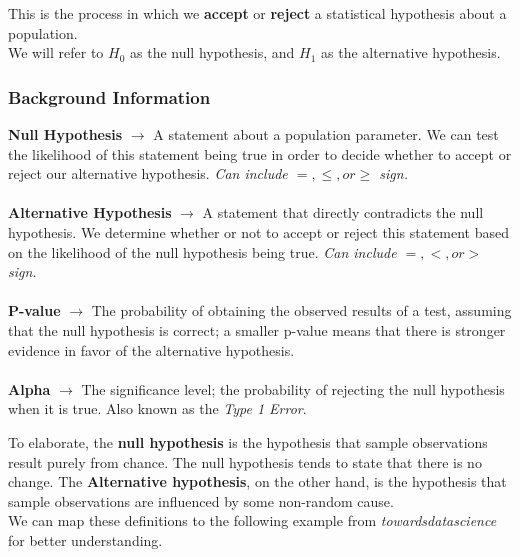 \documentclass[english, 10pt]{article}
\begin{document}
This is the process in which we \textbf{accept} or \textbf{reject} a statistical hypothesis about a population.\\

We will refer to $H_0$ as the null hypothesis, and $H_1$ as the alternative hypothesis.\\

\subsubsection{Background Information}

\begin{tcolorbox}[title=Definition:,colframe=red!75!black,colback=red!5!white,arc=0pt,fonttitle=\bfseries]
\textbf{Null Hypothesis} $\rightarrow$ A statement about a population parameter. We can test the likelihood of this statement being true in order to decide whether to accept or reject our alternative hypothesis. \textit{Can include $=, \leq, or \geq$ sign.}\\\\
\textbf{Alternative Hypothesis} $\rightarrow$ A statement that directly contradicts the null hypothesis. We determine whether or not to accept or reject this statement based on the likelihood of the null hypothesis being true. \textit{Can include $=, <, or >$ sign.}\\\\
\textbf{P-value} $\rightarrow$ The probability of obtaining the observed results of a test, assuming that the null hypothesis is correct; a smaller p-value means that there is stronger evidence in favor of the alternative hypothesis.\\\\
\textbf{Alpha} $\rightarrow$ The significance level; the probability of rejecting the null hypothesis when it is true. Also known as the \textit{Type 1 Error}.
\end{tcolorbox}

\hfill \break To elaborate, the \textbf{null hypothesis} is the hypothesis that sample observations result purely from chance. The null hypothesis tends to state that there is no change. The \textbf{Alternative hypothesis}, on the other hand, is the hypothesis that sample observations are influenced by some non-random cause.\\

We can map these definitions to the following example from \textit{towardsdatascience} for better understanding.\\
\end{document}
